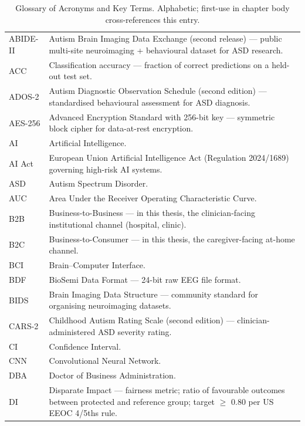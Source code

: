 {\tablestripes\tablefontsize
{}
\begin{xltabular}{\textwidth}{@{} >{\raggedright\arraybackslash}p{2.6cm} L @{}}
\caption[Glossary of Acronyms and Key Terms]{Glossary of Acronyms and Key Terms. Alphabetic; first-use in chapter body cross-references this entry.}\label{tab:glossary_full} \\
\toprule
{} &  \\
\midrule
\endfirsthead
\endhead
\bottomrule
\endfoot
ABIDE-II & Autism Brain Imaging Data Exchange (second release) --- public multi-site neuroimaging + behavioural dataset for ASD research. \\
ACC & Classification accuracy --- fraction of correct predictions on a held-out test set. \\
ADOS-2 & Autism Diagnostic Observation Schedule (second edition) --- standardised behavioural assessment for ASD diagnosis. \\
AES-256 & Advanced Encryption Standard with 256-bit key --- symmetric block cipher for data-at-rest encryption. \\
AI & Artificial Intelligence. \\
AI Act & European Union Artificial Intelligence Act (Regulation 2024/1689) governing high-risk AI systems. \\
ASD & Autism Spectrum Disorder. \\
AUC & Area Under the Receiver Operating Characteristic Curve. \\
B2B & Business-to-Business --- in this thesis, the clinician-facing institutional channel (hospital, clinic). \\
B2C & Business-to-Consumer --- in this thesis, the caregiver-facing at-home channel. \\
BCI & Brain--Computer Interface. \\
BDF & BioSemi Data Format --- 24-bit raw EEG file format. \\
BIDS & Brain Imaging Data Structure --- community standard for organising neuroimaging datasets. \\
CARS-2 & Childhood Autism Rating Scale (second edition) --- clinician-administered ASD severity rating. \\
CI & Confidence Interval. \\
CNN & Convolutional Neural Network. \\
DBA & Doctor of Business Administration. \\
DI & Disparate Impact --- fairness metric; ratio of favourable outcomes between protected and reference group; target $\geq$ 0.80 per US EEOC 4/5ths rule. \\

\end{xltabular}}
